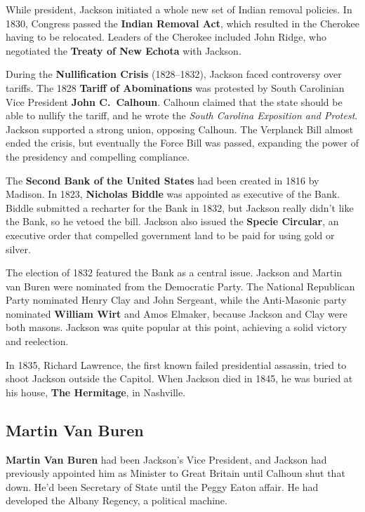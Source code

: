 While president, Jackson initiated a whole new set of Indian removal policies.
In 1830, Congress passed the \textbf{Indian Removal Act},
which resulted in the Cherokee having to be relocated.
Leaders of the Cherokee included John Ridge,
who negotiated the \textbf{Treaty of New Echota} with Jackson.

During the \textbf{Nullification Crisis} (1828--1832), Jackson faced controversy over tariffs.
The 1828 \textbf{Tariff of Abominations}
was protested by South Carolinian Vice President \textbf{John C.\ Calhoun}.
Calhoun claimed that the state should be able to nullify the tariff,
and he wrote the \textit{South Carolina Exposition and Protest}.
Jackson supported a strong union, opposing Calhoun.
The Verplanck Bill almost ended the crisis,
but eventually the Force Bill was passed,
expanding the power of the presidency and compelling compliance.

The \textbf{Second Bank of the United States} had been created in 1816 by Madison.
In 1823, \textbf{Nicholas Biddle} was appointed as executive of the Bank.
Biddle submitted a recharter for the Bank in 1832,
but Jackson really didn't like the Bank, so he vetoed the bill.
Jackson also issued the \textbf{Specie Circular},
an executive order that compelled government land to be paid for using gold or silver.

The election of 1832 featured the Bank as a central issue.
Jackson and Martin van Buren were nominated from the Democratic Party.
The National Republican Party nominated Henry Clay and John Sergeant,
while the Anti-Masonic party nominated \textbf{William Wirt} and Amos Elmaker,
because Jackson and Clay were both masons.
Jackson was quite popular at this point, achieving a solid victory and reelection.

In 1835, Richard Lawrence, the first known failed presidential assassin,
tried to shoot Jackson outside the Capitol.
When Jackson died in 1845, he was buried at his house, \textbf{The Hermitage}, in Nashville.

\subsection*{Martin Van Buren}

\textbf{Martin Van Buren} had been Jackson's Vice President,
and Jackson had previously appointed him as Minister to Great Britain until Calhoun shut that down.
He'd been Secretary of State until the Peggy Eaton affair.
He had developed the Albany Regency, a political machine.

